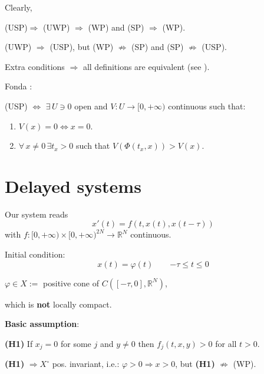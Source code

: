 \documentclass{beamer}
\def\R{\mathbb{R}}
\begin{document}
\begin{frame}{}



Clearly, 

\begin{center}
    (USP)$\Longrightarrow$ (UWP) $\Longrightarrow$ (WP) and
(SP) $ \Longrightarrow$ (WP).
\end{center}



\begin{center}
    
(UWP) $\Longrightarrow$ (USP), but 
(WP) $\not\Longrightarrow$ (SP)
and 
(SP) $\not\Longrightarrow$ (USP). 
\end{center}

Extra conditions $\Longrightarrow$  all definitions are equivalent (see \cite{FM}).

   \smallskip 
\pause  
Fonda \cite{F}:
   \smallskip 
    
    (USP) $\Longleftrightarrow$
        $\exists \, U\ni 0$ open and $V:U\to [0,+\infty)$ continuous such that: 
        \begin{enumerate}
            \item $V(x)=0 \iff x=0$.
            \item $\forall\, x\ne 0\, \exists t_x>0$ such that $V(\Phi(t_x,x)) > V(x)$. 
        \end{enumerate}
\end{frame}

\section{Delayed systems}

\begin{frame}
    
  

Our system reads
\begin{equation}
\label{eq}
x'(t)=f(t,x(t),x(t-\tau))
\end{equation}
with
$f:[0,+\infty)\times [0,+\infty)^{2N}\to \R^N$  continuous.

Initial condition:
\begin{equation}
\label{ic}
x(t) =\varphi(t)
\qquad {-\tau\le t\le 0}
\end{equation}
\begin{center}
    $\varphi\in X:=$ positive cone of $C([-\tau,0],\R^N)$,
\end{center}
which is \textbf{not} locally compact. 

\medskip 

{\bf Basic assumption}: 

\smallskip

{\bf (H1)} \label{posit}
If $x_j=0$ for some $j$ and $y\ne 0$ then $f_j(t,x,y)>0$ for all $t>0$.

\pause 
\bigskip
{\bf (H1)} $\Longrightarrow X^\circ$ pos.  invariant, i.e.: $\varphi>0\Longrightarrow x>0$, but {\bf (H1)} $\not\Longrightarrow$ (WP). 

\end{frame}
\end{document}
